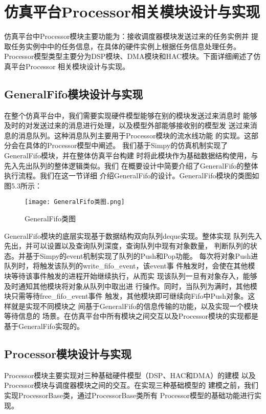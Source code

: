 \section{仿真平台Processor相关模块设计与实现}

仿真平台中Processor模块主要功能为：接收调度器模块发送过来的任务实例并
提取任务实例中中的任务信息，在具体的硬件实例上根据任务信息处理任务。
Processor模型类型主要分为DSP模块、DMA模块和HAC模块。下面详细阐述了仿真平台Processor
相关模块设计与实现。

\subsection{GeneralFifo模块设计与实现}

在整个仿真平台中，我们需要实现硬件模型能够在别的模块发送过来消息时
能够及时的对发送过来的消息进行处理，以及模型外部能够接收别的模型发
送过来消息的消息队列。这种消息队列主要用于Processor模块的流水线功能
的实现。这部分会在具体的Processor模型中阐述。
我们基于Simpy的仿真机制实现了GeneralFifo模块，并在整体仿真平台构建
时将此模块作为基础数据结构使用，与先入先出队列的整体逻辑类似。我们
在概要设计中简要介绍了GeneralFifo的整体执行流程。我们在这一节详细
介绍GeneralFifo的设计。GeneralFifo模块的类图如图5.3所示：
\begin{figure}
    \centering
    \texttt{[image: GeneralFifo类图.png]}
    \caption{GeneralFifo类图}
    \label{fig:badge}
\end{figure}

GeneralFifo模块的底层实现基于数据结构双向队列deque实现。整体实现
队列先入先出，并可以设置以及查询队列深度，查询队列中现有对象数量，
判断队列的状态。并基于Simpy的event机制实现了队列的Push和Pop功能。
每次将对象Push进队列时，将触发该队列的write\_fifo\_event，该event事
件触发时，会使在其他模块等待该事件触发的进程开始继续执行，从而实
现该队列一旦有对象存入，能够及时通知其他模块将对象从队列中取出进
行操作。同时，当队列为满时，其他模块只需等待free\_fifo\_event事件
触发，其他模块即可继续向Fifo中Push对象。这样就是实现不同模块之
间基于GeneralFifo的信息传输的功能，以及实现一个模块等待信息的
场景。在仿真平台中所有模块之间交互以及Processor模块的实现都是
基于GeneralFifo实现的。

\subsection{Processor模块设计与实现}
Processor模块主要实现对三种基础硬件模型（DSP、HAC和DMA）的建模
以及Processor模块与调度器模块之间的交互。在实现三种基础模型的
建模之前，我们实现ProcessorBase类，通过ProcessorBase类所有
Processor模型的基础功能进行实现。

